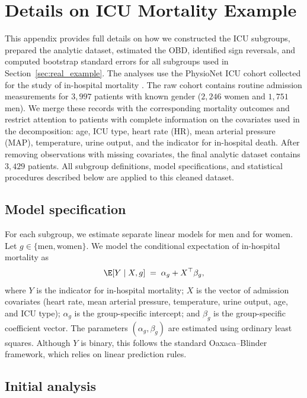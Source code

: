 \section{Details on ICU Mortality Example}
\label{appendix:icu_details}

This appendix provides full details on how we constructed the ICU subgroups, prepared the analytic dataset, estimated the OBD, identified sign reversals, and computed bootstrap standard errors for all subgroups used in Section~\ref{sec:real_example}. The analyses use the PhysioNet ICU cohort collected for the study of in-hospital mortality \citep{goldberger2000physiobank}. The raw cohort contains routine admission measurements for $3,997$ patients with known gender ($2,246$ women and $1,751$ men). We merge these records with the corresponding mortality outcomes and restrict attention to patients with complete information on the covariates used in the decomposition: age, ICU type, heart rate (HR), mean arterial pressure (MAP), temperature, urine output, and the indicator for in-hospital death. After removing observations with missing covariates, the final analytic dataset contains $3,429$ patients. All subgroup definitions, model specifications, and statistical procedures described below are applied to this cleaned dataset.

\subsection*{Model specification}

For each subgroup, we estimate separate linear models for men and for women.  
Let $g \in \{\text{men}, \text{women}\}$.  
We model the conditional expectation of in-hospital mortality as
\[
    \E[Y \mid X, g] \;=\; \alpha_{g} + X^{\top}\beta_{g},
\]
where $Y$ is the indicator for in-hospital mortality;  
$X$ is the vector of admission covariates (heart rate, mean arterial pressure, temperature, urine output, age, and ICU type);  
$\alpha_{g}$ is the group-specific intercept;  
and $\beta_{g}$ is the group-specific coefficient vector.  
The parameters $(\alpha_g,\beta_g)$ are estimated using ordinary least squares.  
Although $Y$ is binary, this follows the standard Oaxaca--Blinder framework, which relies on linear prediction rules.

\subsection*{Initial analysis}

